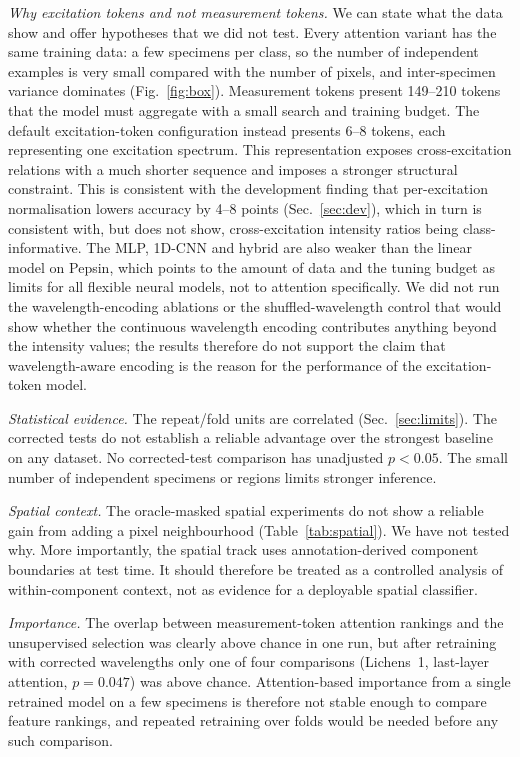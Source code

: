 \documentclass[journal]{IEEEtran}
\begin{document}
\emph{Why excitation tokens and not measurement tokens.} We can state what the data show and offer hypotheses that we did not test. Every attention variant has the same training data: a few specimens per class, so the number of independent examples is very small compared with the number of pixels, and inter-specimen variance dominates (Fig.~\ref{fig:box}). Measurement tokens present 149--210 tokens that the model must aggregate with a small search and training budget. The default excitation-token configuration instead presents 6--8 tokens, each representing one excitation spectrum. This representation exposes cross-excitation relations with a much shorter sequence and imposes a stronger structural constraint. This is consistent with the development finding that per-excitation normalisation lowers accuracy by 4--8 points (Sec.~\ref{sec:dev}), which in turn is consistent with, but does not show, cross-excitation intensity ratios being class-informative. The MLP, 1D-CNN and hybrid are also weaker than the linear model on Pepsin, which points to the amount of data and the tuning budget as limits for all flexible neural models, not to attention specifically. We did not run the wavelength-encoding ablations or the shuffled-wavelength control that would show whether the continuous wavelength encoding contributes anything beyond the intensity values; the results therefore do not support the claim that wavelength-aware encoding is the reason for the performance of the excitation-token model.

\emph{Statistical evidence.} The repeat/fold units are correlated (Sec.~\ref{sec:limits}). The corrected tests do not establish a reliable advantage over the strongest baseline on any dataset. No corrected-test comparison has unadjusted $p<0.05$. The small number of independent specimens or regions limits stronger inference.

\emph{Spatial context.} The oracle-masked spatial experiments do not show a reliable gain from adding a pixel neighbourhood (Table~\ref{tab:spatial}). We have not tested why. More importantly, the spatial track uses annotation-derived component boundaries at test time. It should therefore be treated as a controlled analysis of within-component context, not as evidence for a deployable spatial classifier.

\emph{Importance.} The overlap between measurement-token attention rankings and the unsupervised selection was clearly above chance in one run, but after retraining with corrected wavelengths only one of four comparisons (Lichens~1, last-layer attention, $p=0.047$) was above chance. Attention-based importance from a single retrained model on a few specimens is therefore not stable enough to compare feature rankings, and repeated retraining over folds would be needed before any such comparison.
\end{document}

